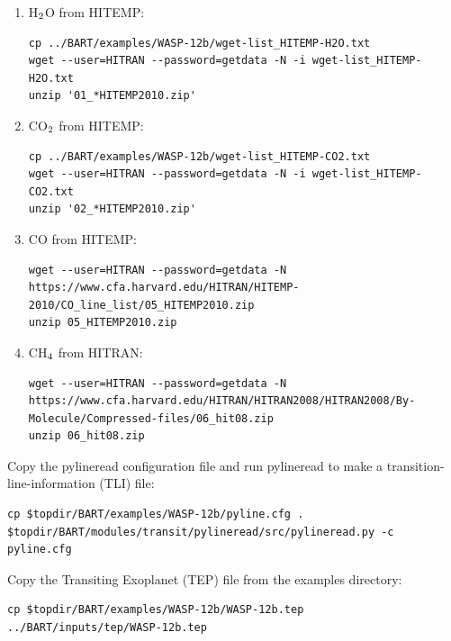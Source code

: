 \documentclass[letterpaper, 12pt]{article}
\begin{document}
\begin{enumerate}
\item H$\sb{2}$O from HITEMP:

{\fontsize{9.8}{1em}\selectfont
\begin{lstlisting}[breaklines]
cp ../BART/examples/WASP-12b/wget-list_HITEMP-H2O.txt
wget --user=HITRAN --password=getdata -N -i wget-list_HITEMP-H2O.txt
unzip '01_*HITEMP2010.zip'
\end{lstlisting}}


\item CO$\sb{2}$ from HITEMP:

{\fontsize{9.8}{1em}\selectfont
\begin{lstlisting}[breaklines]
cp ../BART/examples/WASP-12b/wget-list_HITEMP-CO2.txt
wget --user=HITRAN --password=getdata -N -i wget-list_HITEMP-CO2.txt
unzip '02_*HITEMP2010.zip'
\end{lstlisting}}

\item CO from HITEMP:

{\fontsize{9.8}{1em}\selectfont
\begin{lstlisting}[breaklines]
wget --user=HITRAN --password=getdata -N https://www.cfa.harvard.edu/HITRAN/HITEMP-2010/CO_line_list/05_HITEMP2010.zip
unzip 05_HITEMP2010.zip
\end{lstlisting}}

\item CH$\sb{4}$ from HITRAN:

{\fontsize{9.8}{1em}\selectfont
\begin{lstlisting}[breaklines]
wget --user=HITRAN --password=getdata -N https://www.cfa.harvard.edu/HITRAN/HITRAN2008/HITRAN2008/By-Molecule/Compressed-files/06_hit08.zip 
unzip 06_hit08.zip
\end{lstlisting}}

\end{enumerate}


\noindent Copy the pylineread configuration file and run pylineread to make a transition-line-information (TLI) file:
{\fontsize{9.8}{1em}\selectfont
\begin{verbatim}
cp $topdir/BART/examples/WASP-12b/pyline.cfg .
$topdir/BART/modules/transit/pylineread/src/pylineread.py -c pyline.cfg
\end{verbatim}}

\noindent Copy the Transiting Exoplanet (TEP) file from the examples directory:
{\fontsize{9.8}{1em}\selectfont
\begin{verbatim}
cp $topdir/BART/examples/WASP-12b/WASP-12b.tep ../BART/inputs/tep/WASP-12b.tep
\end{verbatim}}
\end{document}
